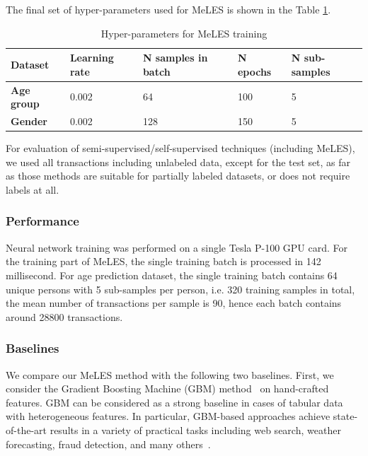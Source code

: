 \documentclass{article}
\begin{document}
The final set of hyper-parameters used for MeLES is shown in the Table \ref{tab-hyper}.

\begin{table}
\centering
\caption{Hyper-parameters for MeLES training}
\begin{tabular}{lllll}
\toprule
\textbf{Dataset} & \textbf{Learning rate} & \textbf{N samples in batch} & \textbf{N epochs} & \textbf{N sub-samples} \\
\midrule
\textbf{Age group} & 0.002 & 64 & 100 & 5 \\
\textbf{Gender} & 0.002 & 128 & 150 & 5 \\
\bottomrule
\end{tabular}
\label{tab-hyper}
\end{table}

For evaluation of semi-supervised/self-supervised techniques (including MeLES), we used all transactions including unlabeled data, except for the test set, as far as those methods are suitable for partially labeled datasets, or does not require labels at all.

\subsubsection{Performance}

Neural network training was performed on a single Tesla P-100 GPU card. For the training part of MeLES, the single training batch is processed in 142 millisecond. For age prediction dataset, the single training batch contains 64 unique persons with 5 sub-samples per person, i.e. 320 training samples in total, the mean number of transactions per sample is 90, hence each batch contains around 28800 transactions.

\subsubsection{Baselines} \label{sec-baselines}

We compare our MeLES method with the following two baselines. First, we consider the Gradient Boosting Machine (GBM) method~\cite{Friedman2001GreedyFA} on hand-crafted features. GBM can be considered as a strong baseline in cases of tabular data with heterogeneous features. In particular, GBM-based approaches achieve state-of-the-art results in a variety of practical tasks including web search, weather forecasting, fraud detection, and many others~\cite{Wu2009AdaptingBF, Vorobev2019LearningTS, Zhang2015AGB, Niu2019ACS}.
\end{document}
